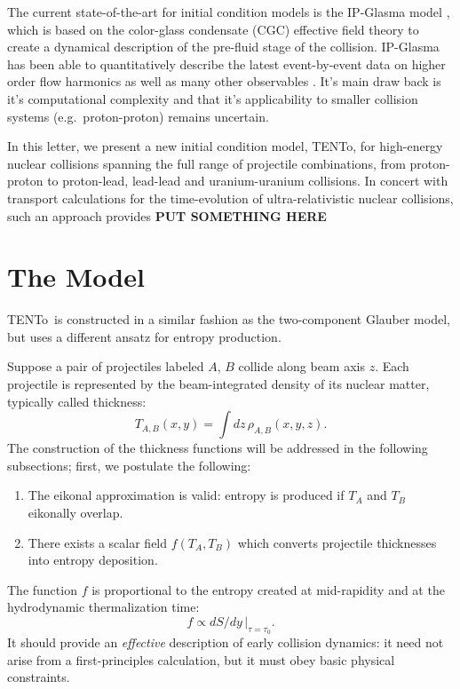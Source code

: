 \documentclass[aps,prl,reprint,amsmath,nofootinbib]{revtex4-1}
\newcommand{\trento}{T\raisebox{-.5ex}{R}ENTo}
\begin{document}
The current state-of-the-art for initial condition models is the IP-Glasma model \cite{}, which is based on the color-glass condensate (CGC) effective 
field theory \cite{} to create a dynamical description of the pre-fluid stage of the collision.  IP-Glasma has been able to quantitatively describe the 
latest event-by-event data on higher order flow harmonics as well as many other observables \cite{Schenke:2014zha}. It's main draw back is it's computational 
complexity and that it's applicability to smaller collision systems (e.g.~proton-proton) remains uncertain.

In this letter, we present a new initial condition model, \trento, for high-energy nuclear collisions spanning the full range of projectile combinations, 
from proton-proton to proton-lead, lead-lead and uranium-uranium collisions. In concert with transport calculations for the time-evolution of ultra-relativistic 
nuclear collisions, such an approach provides {\bf PUT SOMETHING HERE} %

\section{The Model}

\trento\ is constructed in a similar fashion as the two-component Glauber model, but uses a different ansatz
for entropy production. 

Suppose a pair of projectiles labeled $A$, $B$ collide along beam axis $z$.  Each projectile is represented by
the beam-integrated density of its nuclear matter, typically called thickness:
\begin{equation}
  T_{A,B}(x, y) = \int dz \, \rho_{A,B}(x, y, z).
\end{equation}
The construction of the thickness functions will be addressed in the following subsections; first, we
postulate the following:
\begin{enumerate}
  \item The eikonal approximation is valid:  entropy is produced if $T_A$ and $T_B$ eikonally overlap.
  \item There exists a scalar field $f(T_A, T_B)$ which converts projectile thicknesses into entropy
    deposition.
\end{enumerate}
The function $f$ is proportional to the entropy created at mid-rapidity and at the hydrodynamic thermalization
time:
\begin{equation}
  f \propto dS/dy \, |_{\tau = \tau_0}.
\end{equation}
It should provide an \emph{effective} description of early collision dynamics:  it need not arise from a
first-principles calculation, but it must obey basic physical constraints.
\end{document}
